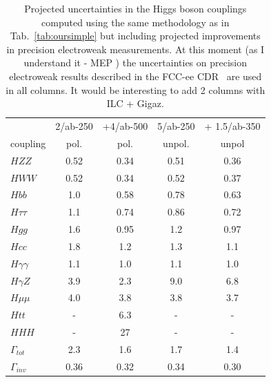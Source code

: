 \begin{table}[!htbp]
\begin{center}
\begin{tabular}{l|cc|c|c}
 &  2/ab-250 & +4/ab-500 &  5/ab-250 &  + 1.5/ab-350\\
coupling &  pol.  &   pol.  &   unpol.  &  unpol  
  \\  \hline 
$HZZ$            &             0.52&   0.34    &   0.51   & 0.36            \\ 
$HWW$            &         0.52  &   0.34   &   0.52   &   0.37    \\ 
 $Hbb$            &     1.0  &  0.58   &  0.78    &    0.63       \\ 
$H\tau\tau$    &          1.1  &   0.74   &   0.86   &  0.72      \\ 
$Hgg$ &                      1.6  & 0.95       &  1.2    &  0.97     \\ 
$Hcc$                       &   1.8  &  1.2   &   1.3   &   1.1    \\ 
$H\gamma\gamma$ &  1.1 &   1.0     &  1.1    &   1.0   \\ 
$H\gamma Z$ &  3.9 &   2.3     &  9.0    &   6.8     \\
$H\mu\mu$                &  4.0  &  3.8     &  3.8    &  3.7   
 \\ 
$Htt$  &                       -     &      6.3     &  -    &  -     \\ 
$HHH$                         &  -    &   27     &   -   &   -  \\ \hline 
$\Gamma_{tot}$             & 2.3  & 1.6    &   1.7    &  1.4       \\  
$\Gamma_{inv}$          &   0.36  & 0.32    &  0.34    &   0.30  \\  \hline
\end{tabular}
\end{center}
\caption{ \label{tab:ournotsosimple}    Projected uncertainties in the Higgs
  boson couplings computed using the same methodology as
 in Tab.~\ref{tab:oursimple} but including projected improvements in
 precision electroweak measurements.  At this moment (as I understand it
 - MEP ) the uncertainties on precision electroweak results described
 in the 
 FCC-ee CDR~\cite{Benedikt:2018qee} are used in all columns.   It
 would be interesting to add 2 columns with ILC + Gigaz.}
\end{table}

